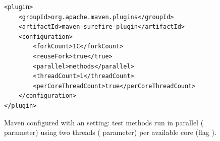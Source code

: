 \begin{figure}[h!]
\centering
\scriptsize
{}
\begin{lstlisting}
<plugin>
    <groupId>org.apache.maven.plugins</groupId>
    <artifactId>maven-surefire-plugin</artifactId>
    <configuration>
        <forkCount>1C</forkCount>
        <reuseFork>true</true>
        <parallel>methods</parallel>
        <threadCount>1</threadCount>
        <perCoreThreadCount>true</perCoreThreadCount>
    </configuration>
</plugin>
\end{lstlisting}
    \caption{\label{fig:surefire} Maven configured with an
    \Fork{}\SeqClassParMeth{} setting: test methods run in parallel
    ( parameter) using two threads
    ( parameter) per available core (flag
    ).}
\end{figure}





